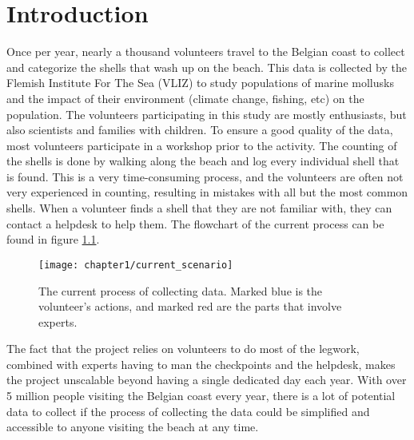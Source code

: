 
\chapter{Introduction}

Once per year, nearly a thousand volunteers travel to the Belgian coast to collect and categorize the shells that wash up on the beach. This data is collected by the Flemish Institute For The Sea (VLIZ) to study populations of marine mollusks and the impact of their environment (climate change, fishing, etc) on the population. The volunteers participating in this study are mostly enthusiasts, but also scientists and families with children. To ensure a good quality of the data, most volunteers participate in a workshop prior to the activity. The counting of the shells is done by walking along the beach and log every individual shell that is found. This is a very time-consuming process, and the volunteers are often not very experienced in counting, resulting in mistakes with all but the most common shells. When a volunteer finds a shell that they are not familiar with, they can contact a helpdesk to help them. The flowchart of the current process can be found in figure \ref{fig:1_current_scenario}. 

\begin{figure}[h]
	\centering
	\texttt{[image: chapter1/current\_scenario]}
	\caption{\label{fig:1_current_scenario}The current process of collecting data. \newline
	Marked blue is the volunteer's actions, and marked red are the parts that involve experts.}
\end{figure}

The fact that the project relies on volunteers to do most of the legwork, combined with experts having to man the checkpoints and the helpdesk, makes the project unscalable beyond having a single dedicated day each year. With over 5 million people
visiting the Belgian coast every year\cite{Kustportaal}, there is a lot of potential data to collect if the process of collecting the data could be simplified and accessible to anyone visiting the beach at any time.

